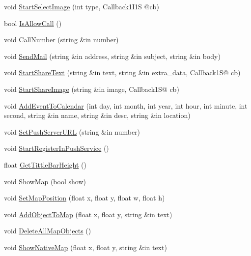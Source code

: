 \begin{DoxyCompactItemize}
void \hyperlink{class_scene_script_core_mobile_a7fbea5c354c51ca5170bb5d5c67a0e28}{Start\+Select\+Image} (int type, Callback1\+I1S @cb)
\item 
bool \hyperlink{class_scene_script_core_mobile_a8f78dc37f8c60b266ea1a91a23243c6c}{Is\+Allow\+Call} ()
\item 
void \hyperlink{class_scene_script_core_mobile_ae32e99bac06ecfb842cecf9bac3e0b22}{Call\+Number} (string \&in number)
\item 
void \hyperlink{class_scene_script_core_mobile_ae8a8eebd4be1acb3a9901048c0277926}{Send\+Mail} (string \&in address, string \&in subject, string \&in body)
\item 
void \hyperlink{class_scene_script_core_mobile_a0671f838d4a51ceda5d075d8bfb33101}{Start\+Share\+Text} (string \&in text, string \&in extra\+\_\+data, Callback1S@ cb)
\item 
void \hyperlink{class_scene_script_core_mobile_a8d45d7b8789e93a3a79f23b34f544c28}{Start\+Share\+Image} (string \&in image, Callback1S@ cb)
\item 
void \hyperlink{class_scene_script_core_mobile_a0fa7d779e73b1d58218846266739c487}{Add\+Event\+To\+Calendar} (int day, int month, int year, int hour, int minute, int second, string \&in name, string \&in desc, string \&in location)
\item 
void \hyperlink{class_scene_script_core_mobile_a400acec3e49bed461f127b204f0368a5}{Set\+Push\+Server\+U\+RL} (string \&in number)
\item 
void \hyperlink{class_scene_script_core_mobile_a10b274acb407ecc9873e31d85bd500a2}{Start\+Register\+In\+Push\+Service} ()
\item 
float \hyperlink{class_scene_script_core_mobile_ad09ce5f5f84f1df405c6dd22182abfb9}{Get\+Tittle\+Bar\+Height} ()
\item 
void \hyperlink{class_scene_script_core_mobile_a3bc72aff3ec6e1b8b16b2cd5e009b08d}{Show\+Map} (bool show)
\item 
void \hyperlink{class_scene_script_core_mobile_aa2e383859b3fa9593c305988f5b6b92b}{Set\+Map\+Position} (float x, float y, float w, float h)
\item 
void \hyperlink{class_scene_script_core_mobile_a4976087580c2e72e5301a3f6530b7aee}{Add\+Object\+To\+Map} (float x, float y, string \&in text)
\item 
void \hyperlink{class_scene_script_core_mobile_a851aa58f214a966bb04abdbb1187e52e}{Delete\+All\+Map\+Objects} ()
\item 
void \hyperlink{class_scene_script_core_mobile_a64b526784ef4c35f5fd3c8064551ce3f}{Show\+Native\+Map} (float x, float y, string \&in text)

\end{DoxyCompactItemize}

